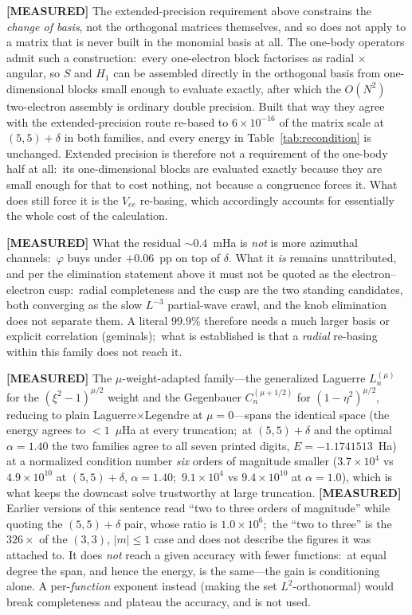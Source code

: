 \documentclass[aps,pra,twocolumn,superscriptaddress,longbibliography]{revtex4-2}
\newcommand{\gvq}[2]{#2}
\begin{document}
\textbf{[MEASURED]} The extended-precision requirement above constrains
the \emph{change of basis}, not the orthogonal matrices themselves, and so
does not apply to a matrix that is never built in the monomial basis at
all.  The one-body operators admit such a construction:\ every
one-electron block factorises as radial $\times$ angular, so $S$ and
$H_1$ can be assembled directly in the orthogonal basis from
one-dimensional blocks small enough to evaluate exactly, after which the
$O(N^2)$ two-electron assembly is ordinary double precision.  Built that
way they agree with the extended-precision route re-based to
$6\times10^{-16}$ of the matrix scale at $(5,5)+\delta$ in both families,
and every energy in Table~\ref{tab:recondition} is unchanged.  Extended
precision is therefore not a requirement of the one-body half at all:\ its
one-dimensional blocks are evaluated exactly because they are small enough
for that to cost nothing, not because a congruence forces it.  What does
still force it is the $V_{ee}$ re-basing, which accordingly accounts for
essentially the whole cost of the calculation.

\textbf{[MEASURED]} What the residual $\sim\!0.4$~mHa is \emph{not} is
more azimuthal channels:\ $\varphi$ buys under $+0.06$~pp on top of
$\delta$.  What it \emph{is} remains unattributed, and per the
elimination statement above it must not be quoted as the
electron--electron cusp:\ radial completeness and the cusp are the two
standing candidates, both converging as the slow $L^{-3}$ partial-wave
crawl, and the knob elimination does not separate them.  A literal
$99.9\%$ therefore needs a much larger basis or explicit correlation
(geminals);\ what is established is that a \emph{radial} re-basing
within this family does not reach it.

\textbf{[MEASURED]} The $\mu$-weight-adapted family---the generalized
Laguerre $L_n^{(\mu)}$ for the $(\xi^2-1)^{\mu/2}$ weight and the
Gegenbauer $C_n^{(\mu+1/2)}$ for $(1-\eta^2)^{\mu/2}$, reducing to plain
Laguerre$\times$Legendre at $\mu = 0$---spans the identical space (the
energy agrees to $<1$~$\mu$Ha at every truncation;\ at $(5,5)+\delta$ and the
optimal $\alpha = \gvq{p12_rebased_alpha_opt}{1.40}$ the two families agree to
all seven printed digits, $E = -1.1741513$~Ha) at a normalized
condition number \emph{six} orders of magnitude smaller
($3.7\times10^4$ vs $4.9\times10^{10}$ at $(5,5)+\delta$, $\alpha = 1.40$;\
$9.1\times10^4$ vs $9.4\times10^{10}$ at $\alpha = 1.0$), which is what
keeps the downcast solve trustworthy at large truncation.
\textbf{[MEASURED]} Earlier versions of this sentence read ``two to three orders
of magnitude'' while quoting the $(5,5)+\delta$ pair, whose ratio is
$1.0\times10^{6}$;\ the ``two to three'' is the $326\times$ of the $(3,3)$,
$|m|\le1$ case and does not describe the figures it was attached to.  It does
\emph{not} reach a given accuracy with fewer functions:\ at equal degree
the span, and hence the energy, is the same---the gain is conditioning
alone.  A per-\emph{function} exponent instead (making the set
$L^2$-orthonormal) would break completeness and plateau the accuracy,
and is not used.
\end{document}
